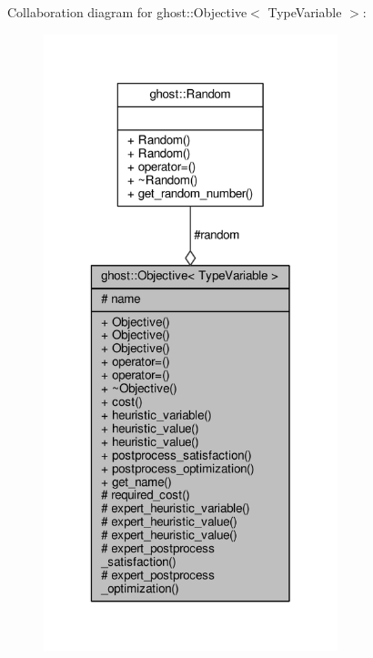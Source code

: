 Collaboration diagram for ghost\-:\-:Objective$<$ Type\-Variable $>$\-:\nopagebreak
\begin{figure}[H]
\begin{center}
\leavevmode
\includegraphics[width=242pt]{classghost_1_1Objective__coll__graph}
\end{center}
\end{figure}
